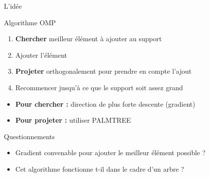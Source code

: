 \begin{frame}{L'idée}
\begin{block}{Algorithme OMP}
	\begin{enumerate}
		\item \textbf{Chercher} meilleur élément à ajouter au support
		\item Ajouter l'élément
		\item \textbf{Projeter} orthogonalement pour prendre en compte l'ajout
		\item Recommencer jusqu'à ce que le support soit assez grand
	\end{enumerate}
\end{block}
\begin{itemize}
\item \textbf{Pour chercher :} direction de plus forte descente (gradient)
\item \textbf{Pour projeter :} utiliser PALMTREE
\end{itemize}
\begin{exampleblock}{Questionnements}
\begin{itemize}
	\item Gradient convenable pour ajouter le meilleur élément possible ?
	\item Cet algorithme fonctionne t-il dans le cadre d'un arbre ?
\end{itemize}
\end{exampleblock}
\end{frame}

